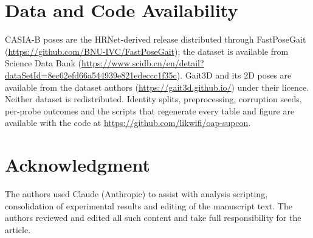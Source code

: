\documentclass[journal]{IEEEtran}
\begin{document}
\section*{Data and Code Availability}
CASIA-B poses are the HRNet-derived release distributed through FastPoseGait
(\url{https://github.com/BNU-IVC/FastPoseGait}); the dataset is available from
Science Data Bank
(\url{https://www.scidb.cn/en/detail?dataSetId=8ec62efd66a544939e821edeccc1f35c}).
Gait3D and its 2D poses are available from the dataset authors
(\url{https://gait3d.github.io/}) under their licence. Neither dataset is
redistributed. Identity splits, preprocessing, corruption seeds, per-probe
outcomes and the scripts that regenerate every table and figure are available
with the code at \url{https://github.com/likwifi/oap-supcon}.

\section*{Acknowledgment}
The authors used Claude (Anthropic) to assist with analysis scripting,
consolidation of experimental results and editing of the manuscript text. The
authors reviewed and edited all such content and take full responsibility for
the article.



\end{document}
